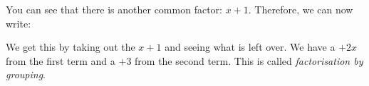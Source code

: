       \label{m39394*id278536}You can see that there is another common factor: $x+1$. Therefore, we can now write:\par 
      \label{m39394*id278556}\nopagebreak\noindent{}
      \label{m39394*id278591}We get this by taking out the $x+1$ and seeing what is left over. We have a $+2x$\hspace{1ex}from the first term and a $+3$ from the second term. This is called \textsl{factorisation by grouping}.\par 
\label{m39394*secfhsst!!!underscore!!!id2835}\vspace{.5cm} 
      \noindent
